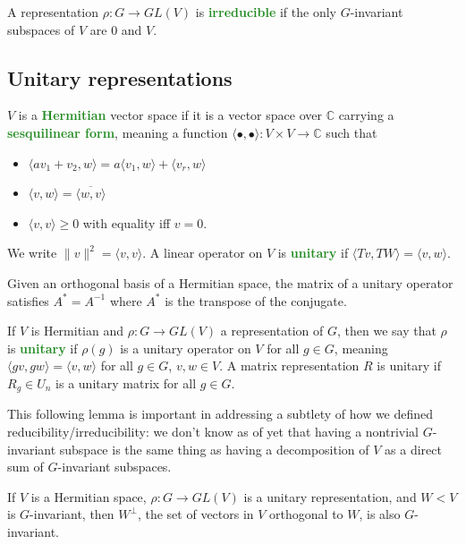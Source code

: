 \documentclass[10pt]{scrartcl}
\providecommand{\ol}{\overline}
\providecommand{\CC}{\mathbb C}
\providecommand{\ii}{\item}
\providecommand{\inv}{^{-1}}
\providecommand{\vocab}[1]{{\textbf{\textcolor{ForestGreen}{#1}}}}
\begin{document}
\begin{definition}
	A representation $\rho\colon G\to GL(V)$ is \vocab{irreducible}
	if the only $G$-invariant subspaces of $V$ are $0$ and $V$.
\end{definition}

\subsection{Unitary representations}

\begin{definition}
	$V$ is a \vocab{Hermitian} vector space if it is a vector space over $\CC$
	carrying a \vocab{sesquilinear form}, meaning a function
	$\langle\bullet,\bullet\rangle\colon V\times V\to\CC$ such that
	\begin{itemize}
		\ii $\langle av_1 + v_2,w\rangle = a\langle v_1,w\rangle +
		\langle v_r,w\rangle$
		\ii $\langle v,w\rangle = \ol{\langle w,v\rangle}$
		\ii $\langle v,v\rangle\ge 0$ with equality iff $v=0$.
	\end{itemize}
	We write $\|v\|^2 = \langle v,v\rangle$.
	A linear operator on $V$ is \vocab{unitary} if
	$\langle Tv,TW\rangle = \langle v,w\rangle$.
\end{definition}

Given an orthogonal basis of a Hermitian space, the matrix of
a unitary operator satisfies $A^* = A\inv$ where
$A^*$ is the transpose of the conjugate.

\begin{definition}
	If $V$ is Hermitian and $\rho\colon G\to GL(V)$ a representation of $G$,
	then we say that $\rho$ is \vocab{unitary} if $\rho(g)$
	is a unitary operator on $V$ for all $g\in G$, meaning
	$\langle gv,gw\rangle = \langle v,w\rangle$ for all $g\in G$, $v,w\in V$.
	A matrix representation $R$ is unitary if $R_g\in U_n$
	is a unitary matrix for all $g\in G$.
\end{definition}

This following lemma is important in addressing a subtlety of
how we defined reducibility/irreducibility:
we don't know as of yet that having a nontrivial $G$-invariant subspace
is the same thing as having a decomposition of $V$ as a direct sum
of $G$-invariant subspaces.
\begin{lemma}
	If $V$ is a Hermitian space, $\rho\colon G\to GL(V)$ is a
	unitary representation, and $W<V$ is $G$-invariant,
	then $W^\perp$, the set of vectors in $V$ orthogonal to $W$,
	is also $G$-invariant.
\end{lemma}
\end{document}
